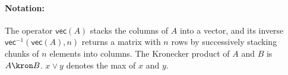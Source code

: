 \paragraph{Notation: }
 \sloppy
The operator $\mathsf{vec}(A)$ stacks the columns of $A$ into a vector, and its inverse $\mathsf{vec}^{-1}(\mathsf{vec}(A), n)$ returns a matrix with $n$ rows by successively stacking chunks of $n$ elements into columns. The Kronecker product of $A$ and $B$ is $A \kron B$. $x \vee y$ denotes the max of $x$ and $y$.


